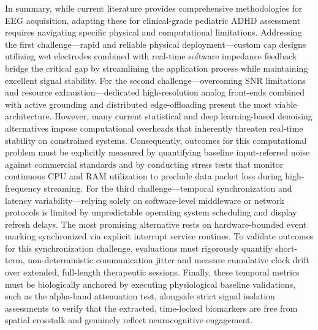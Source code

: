 In summary, while current literature provides comprehensive methodologies for EEG acquisition, adapting these for clinical-grade pediatric \gls{ADHD} assessment requires navigating specific physical and computational limitations. Addressing the first challenge---rapid and reliable physical deployment---custom cap designs utilizing wet electrodes combined with real-time software impedance feedback bridge the critical gap by streamlining the application process while maintaining excellent signal stability. For the second challenge---overcoming \gls{SNR} limitations and resource exhaustion---dedicated high-resolution analog front-ends combined with active grounding and distributed edge-offloading present the most viable architecture. However, many current statistical and deep learning-based denoising alternatives impose computational overheads that inherently threaten real-time stability on constrained systems. Consequently, outcomes for this computational problem must be explicitly measured by quantifying baseline input-referred noise against commercial standards and by conducting stress tests that monitor continuous CPU and RAM utilization to preclude data packet loss during high-frequency streaming. For the third challenge---temporal synchronization and latency variability---relying solely on software-level middleware or network protocols is limited by unpredictable operating system scheduling and display refresh delays. The most promising alternative rests on hardware-bounded event marking synchronized via explicit interrupt service routines. To validate outcomes for this synchronization challenge, evaluations must rigorously quantify short-term, non-deterministic communication jitter and measure cumulative clock drift over extended, full-length therapeutic sessions. Finally, these temporal metrics must be biologically anchored by executing physiological baseline validations, such as the alpha-band attenuation test, alongside strict signal isolation assessments to verify that the extracted, time-locked biomarkers are free from spatial crosstalk and genuinely reflect neurocognitive engagement.



